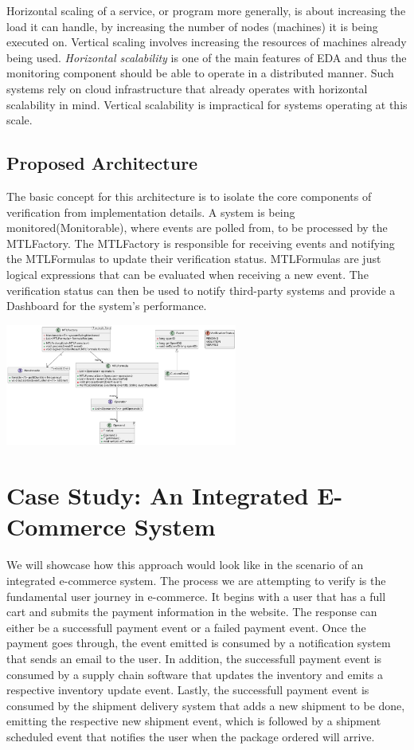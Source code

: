 \documentclass[twocolumn]{article}
\begin{document}
\par
Horizontal scaling of a service, or program more generally, is about increasing the load it can handle,
by increasing the number of nodes (machines) it is being executed on.
Vertical scaling involves increasing the resources of machines already being used.
\emph{Horizontal scalability} is one of the main features of EDA and thus the monitoring component should be able to operate in a distributed manner. Such systems rely on cloud infrastructure that already operates with horizontal scalability in mind.
Vertical scalability is impractical for systems operating at this scale.
\subsection{Proposed Architecture}
The basic concept for this architecture is to isolate the core components of verification from implementation details.
A system is being monitored(Monitorable), where events are polled from, to be processed by the MTLFactory. The MTLFactory is responsible for receiving events and notifying the MTLFormulas to update their verification status. MTLFormulas are just logical expressions that can be evaluated when receiving a new event. The verification status can then be used to notify third-party systems and provide a Dashboard for the system's performance.

\includegraphics[width=3in]{uml-diagram.pdf}


\section{Case Study: An Integrated E-Commerce System}
We will showcase how this approach would look like in the scenario of an integrated e-commerce system.
The process we are attempting to verify is the fundamental user journey in e-commerce.
It begins with a user that has a full cart and submits the payment information in the website.
The response can either be a successfull payment event or a failed payment event.
Once the payment goes through, the event emitted is consumed by a notification system that sends an email to the user.
In addition, the successfull payment event is consumed by a supply chain software that updates the inventory and emits
a respective inventory update event.
Lastly, the successfull payment event is consumed by the shipment delivery system that adds a new shipment to be done,
emitting the respective new shipment event, which is followed by a shipment scheduled event that notifies the user when
the package ordered will arrive.
\end{document}
